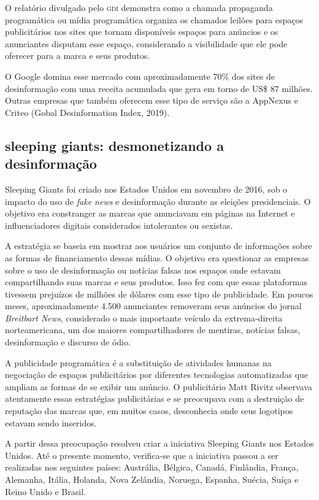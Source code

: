 O relatório divulgado pelo \textsc{gdi} demonstra como a chamada propaganda
programática ou mídia programática organiza os chamados leilões para
espaços publicitários nos sites que tornam disponíveis espaços para
anúncios e os anunciantes disputam esse espaço, considerando a
visibilidade que ele pode oferecer para a marca e seus produtos.

O Google domina esse mercado com aproximadamente 70\% dos sites de
desinformação com uma receita acumulada que gera em torno de US\$ 87
milhões. Outras empresas que também oferecem esse tipo de serviço são a
AppNexus e Criteo (Gobal Desinformation Index, 2019).

\subsection{sleeping giants: desmonetizando a desinformação}

Sleeping Giants foi criado nos Estados Unidos em novembro de 2016, sob o
impacto do uso de \textit{fake news} e desinformação durante as eleições
presidenciais. O objetivo era constranger as marcas que anunciavam em
páginas na Internet e influenciadores digitais considerados intolerantes
ou sexistas.

A estratégia se baseia em mostrar aos usuários um conjunto de
informações sobre as formas de financiamento dessas mídias. O objetivo
era questionar as empresas sobre o uso de desinformação ou notícias
falsas nos espaços onde estavam compartilhando suas marcas e seus
produtos. Isso fez com que essas plataformas tivessem prejuízos de
milhões de dólares com esse tipo de publicidade. Em poucos meses,
aproximadamente 4.500 anunciantes removeram seus anúncios do jornal
\textit{Breitbart News}, considerado o mais importante veículo da extrema-direita norteamericana, um dos maiores compartilhadores de mentiras,
notícias falsas, desinformação e discurso de ódio.

A publicidade programática é a substituição de atividades humanas na
negociação de espaços publicitários por diferentes tecnologias
automatizadas que ampliam as formas de se exibir um anúncio. O
publicitário Matt Rivitz observava atentamente essas estratégias
publicitárias e se preocupava com a destruição de reputação das marcas
que, em muitos casos, desconhecia onde seus logotipos estavam sendo
inseridos.

A partir dessa preocupação resolveu criar a iniciativa Sleeping Giants
nos Estados Unidos. Até o presente momento, verifica-se que a iniciativa
passou a ser realizadas nos seguintes países: Austrália, Bélgica,
Canadá, Finlândia, França, Alemanha, Itália, Holanda, Nova Zelândia,
Noruega, Espanha, Suécia, Suíça e Reino Unido e Brasil.

